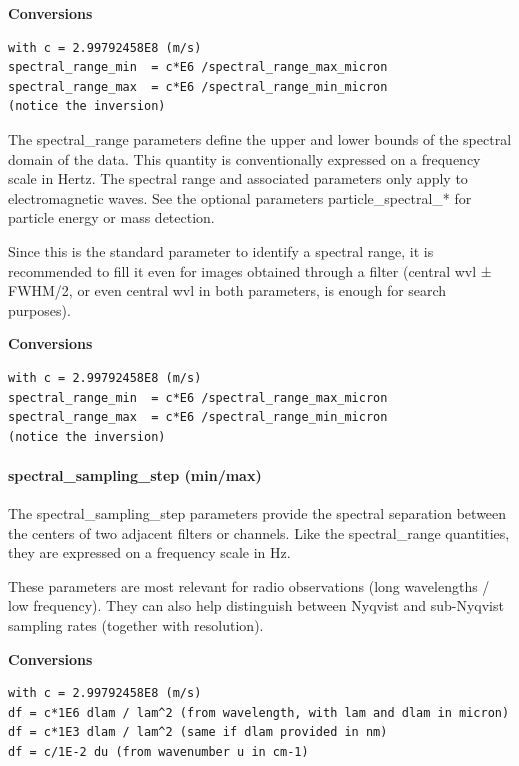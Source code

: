 \documentclass[11pt,a4paper]{ivoa}
\begin{document}
\textbf{Conversions}




\begin{verbatim}
with c = 2.99792458E8 (m/s)
spectral_range_min  = c*E6 /spectral_range_max_micron
spectral_range_max  = c*E6 /spectral_range_min_micron
(notice the inversion)
\end{verbatim}




The spectral\_range parameters define the upper and lower bounds of the spectral domain of the data. This quantity is conventionally expressed on a frequency scale in Hertz. The spectral range and associated parameters only apply to electromagnetic waves. See the optional parameters particle\_spectral\_* for particle energy or mass detection.

Since this is the standard parameter to identify a spectral range, it is recommended to fill it even for images obtained through a filter (central wvl ± FWHM/2, or even central wvl in both parameters, is enough for search purposes). 





\textbf{Conversions}




\begin{verbatim}
with c = 2.99792458E8 (m/s)
spectral_range_min  = c*E6 /spectral_range_max_micron
spectral_range_max  = c*E6 /spectral_range_min_micron
(notice the inversion)
\end{verbatim}




\paragraph{spectral\_sampling\_step (min/max)}

The spectral\_sampling\_step parameters provide the spectral separation between the centers of two adjacent filters or channels. Like the spectral\_range quantities, they are expressed on a frequency scale in Hz. 

These parameters are most relevant for radio observations (long wavelengths / low frequency). They can also help distinguish between Nyqvist and sub-Nyqvist sampling rates (together with resolution).





\textbf{Conversions}




\begin{verbatim}
with c = 2.99792458E8 (m/s)
df = c*1E6 dlam / lam^2 (from wavelength, with lam and dlam in micron)
df = c*1E3 dlam / lam^2 (same if dlam provided in nm)
df = c/1E-2 du (from wavenumber u in cm-1)
\end{verbatim}
\end{document}
